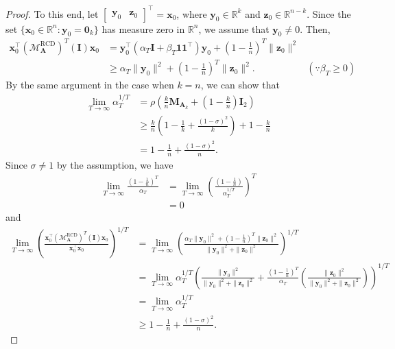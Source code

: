 \documentclass{article}
\theoremstyle{plain}
\theoremstyle{definition}
\theoremstyle{remark}
\def\bigopen#1{\left(#1\right)}
\newcommand{\RCD}{\text{RCD}} %
\newcommand{\MARCD}{\mathcal{M}_{\bm{A}}^{\RCD}} %
\def\vzero{{\bm{0}}}
\def\vone{{\bm{1}}}
\def\vx{{\bm{x}}}
\def\vy{{\bm{y}}}
\def\vz{{\bm{z}}}
\def\mA{{\bm{A}}}
\def\mI{{\bm{I}}}
\def\mM{{\bm{M}}}
\newcommand{\R}{\mathbb{R}}
\begin{document}
\begin{proof}
To this end, let $\begin{bmatrix}
    \vy_0 & \vz_0
\end{bmatrix}^{\top} = \vx_0$, where $\vy_0\in \R^k$ and $\vz_0\in \R^{n-k}$. Since the set $\{\vx_0 \in \R^n: \vy_0 = \vzero_k\}$ has measure zero in $\R^n$, we assume that $\vy_0 \ne 0$. Then, 
\begin{align*}
    \vx_0^{\top} (\MARCD)^T (\mI) \vx_0 &= \vy_0^{\top} (\alpha_T \mI + \beta_T \vone \vone^{\top}) \vy_0 + \bigopen{1-\frac{1}{n}}^T \|\vz_0\|^2 \\
    &\ge \alpha_T \|\vy_0\|^2 + \bigopen{1-\frac{1}{n}}^T \|\vz_0\|^2. & (\because \beta_T\ge 0)
\end{align*}
By the same argument in the case when $k=n$, we can show that 
\begin{align*}
    \lim_{T\to \infty} \alpha_T^{1/T} &= \rho\bigopen{\frac{k}{n} \mM_{\mA_k} + \bigopen{1-\frac{k}{n}} \mI_2} \\
    &\ge \frac{k}{n}\bigopen{1 - \frac{1}{k} + \frac{(1-\sigma)^2}{k}} + 1 - \frac{k}{n} \\
    &= 1 - \frac{1}{n} + \frac{(1-\sigma)^2}{n}.
\end{align*}
Since $\sigma \ne 1$ by the assumption, we have 
\begin{align*}
    \lim_{T \to \infty} \frac{\bigopen{1-\frac{1}{n}}^T}{\alpha_T} &= \lim_{T \to \infty} \bigopen{\frac{\bigopen{1-\frac{1}{n}}}{\alpha_T^{1/T}}}^T \\
    &= 0
\end{align*}
and 
\begin{align*}
    \lim_{T \to \infty} \bigopen{\frac{\vx_0^{\top} (\MARCD)^T (\mI) \vx_0}{\vx_0^{\top} \vx_0}}^{1/T} &= \lim_{T \to \infty} \bigopen{\frac{\alpha_T \|\vy_0\|^2 + \bigopen{1-\frac{1}{n}}^T \|\vz_0\|^2}{\|\vy_0\|^2 + \|\vz_0\|^2}}^{1/T} \\
    &= \lim_{T \to \infty} \alpha_T^{1/T} \bigopen{\frac{\|\vy_0\|^2}{\|\vy_0\|^2 + \|\vz_0\|^2} + \frac{\bigopen{1-\frac{1}{n}}^T}{\alpha_T} \bigopen{\frac{\|\vz_0\|^2}{\|\vy_0\|^2 + \|\vz_0\|^2}}}^{1/T} \\
    &= \lim_{T \to \infty} \alpha_T^{1/T} \\
    &\ge 1 - \frac{1}{n} + \frac{(1-\sigma)^2}{n}.
\end{align*}



\end{proof}
\end{document}
